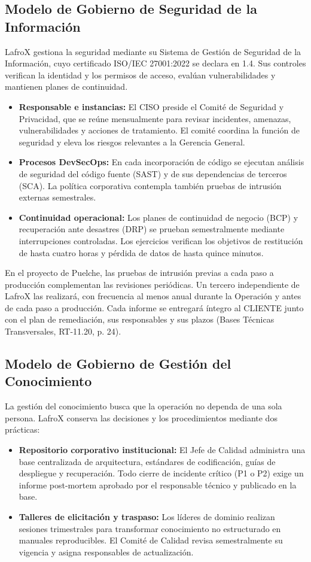 \subsection{Modelo de Gobierno de Seguridad de la Información}
LafroX gestiona la seguridad mediante su Sistema de Gestión de Seguridad de la Información, cuyo certificado ISO/IEC 27001:2022 se declara en 1.4. Sus controles verifican la identidad y los permisos de acceso, evalúan vulnerabilidades y mantienen planes de continuidad.
\begin{itemize}
    \item \textbf{Responsable e instancias:} El CISO preside el Comité de Seguridad y Privacidad, que se reúne mensualmente para revisar incidentes, amenazas, vulnerabilidades y acciones de tratamiento. El comité coordina la función de seguridad y eleva los riesgos relevantes a la Gerencia General.
    \item \textbf{Procesos DevSecOps:} En cada incorporación de código se ejecutan análisis de seguridad del código fuente (SAST) y de sus dependencias de terceros (SCA). La política corporativa contempla también pruebas de intrusión externas semestrales.
    \item \textbf{Continuidad operacional:} Los planes de continuidad de negocio (BCP) y recuperación ante desastres (DRP) se prueban semestralmente mediante interrupciones controladas. Los ejercicios verifican los objetivos de restitución de hasta cuatro horas y pérdida de datos de hasta quince minutos.
\end{itemize}

En el proyecto de Puelche, las pruebas de intrusión previas a cada paso a producción complementan las revisiones periódicas. Un tercero independiente de LafroX las realizará, con frecuencia al menos anual durante la Operación y antes de cada paso a producción. Cada informe se entregará íntegro al CLIENTE junto con el plan de remediación, sus responsables y sus plazos (Bases Técnicas Transversales, RT-11.20, p. 24).

\subsection{Modelo de Gobierno de Gestión del Conocimiento}
La gestión del conocimiento busca que la operación no dependa de una sola persona. LafroX conserva las decisiones y los procedimientos mediante dos prácticas:
\begin{itemize}
    \item \textbf{Repositorio corporativo institucional:} El Jefe de Calidad administra una base centralizada de arquitectura, estándares de codificación, guías de despliegue y recuperación. Todo cierre de incidente crítico (P1 o P2) exige un informe post-mortem aprobado por el responsable técnico y publicado en la base.
    \item \textbf{Talleres de elicitación y traspaso:} Los líderes de dominio realizan sesiones trimestrales para transformar conocimiento no estructurado en manuales reproducibles. El Comité de Calidad revisa semestralmente su vigencia y asigna responsables de actualización.
\end{itemize}

